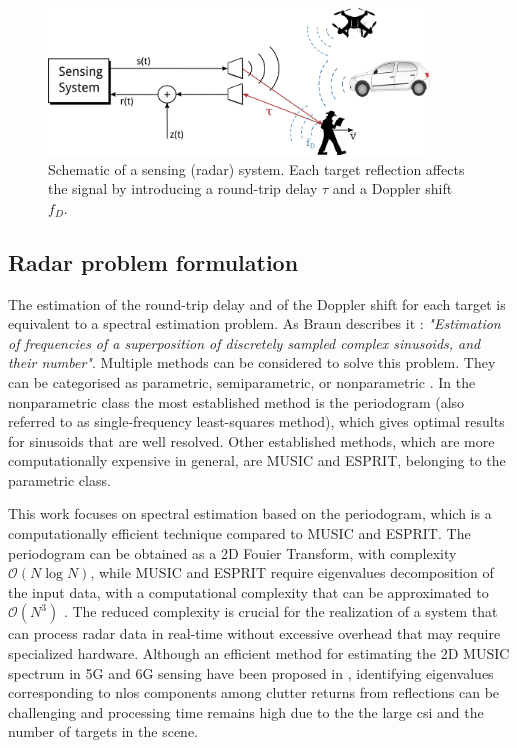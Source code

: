     \begin{figure}[t]
    	\centering
    	\includegraphics[width=0.9\textwidth]{Images/introduction/sensing_operation.png}
    	\caption{\small Schematic of a sensing (radar) system. Each target reflection affects the signal by introducing a round-trip delay $\tau$ and a Doppler shift $f_D$.}
    	\label{fig:sensing_operation}
    \end{figure}
    
    \subsection{Radar problem formulation}
    
    The estimation of the round-trip delay and of the Doppler shift for each target is equivalent to a spectral estimation problem. As Braun describes it \cite{Braun2014OFDMRA}: \textit{"Estimation of frequencies of a superposition of discretely sampled complex sinusoids, and their number"}.
    Multiple methods can be considered to solve this problem. They can be categorised as parametric, semiparametric, or nonparametric \cite{Stoica_New_Method_Parameter_Estimation}. 
    In the nonparametric class the most established method is the periodogram (also referred to as single-frequency least-squares method), which gives optimal results for sinusoids that are well resolved.
    Other established methods, which are more computationally expensive in general, are MUSIC and ESPRIT, belonging to the parametric class.
    
    This work focuses on spectral estimation based on the periodogram, which is a computationally efficient technique compared to MUSIC and ESPRIT.
    The periodogram can be obtained as a 2D Fouier Transform, with complexity $\mathcal O(N\log N)$, while MUSIC and ESPRIT require eigenvalues decomposition of the input data, with a computational complexity that can be approximated to $\mathcal O(N^3)$ \cite{Henninger_Mandelli_Arnold_EfficientMUSIC}.
    The reduced complexity is crucial for the realization of a system that can process radar data in real-time without excessive overhead that may require specialized hardware.
    Although an efficient method for estimating the 2D MUSIC spectrum in 5G and 6G sensing have been proposed in \cite{Henninger_Mandelli_Arnold_EfficientMUSIC}, identifying eigenvalues corresponding to \gls{nlos} components among clutter returns from reflections can be challenging and processing time remains high due to the the large \gls{csi} and the number of targets in the scene.
    
